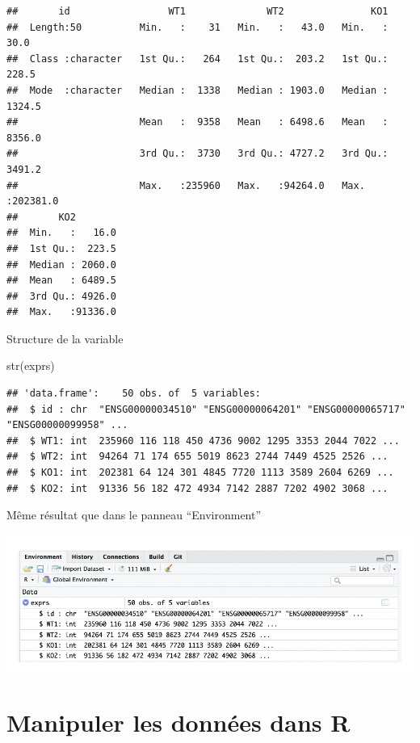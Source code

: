 \documentclass[
]{book}
\newenvironment{Shaded}{\begin{snugshade}}{\end{snugshade}}
\newcommand{\FunctionTok}[1]{\textcolor[rgb]{0.00,0.00,0.00}{#1}}
\newcommand{\NormalTok}[1]{#1}
\begin{document}
\begin{verbatim}
##       id                 WT1              WT2               KO1          
##  Length:50          Min.   :    31   Min.   :   43.0   Min.   :    30.0  
##  Class :character   1st Qu.:   264   1st Qu.:  203.2   1st Qu.:   228.5  
##  Mode  :character   Median :  1338   Median : 1903.0   Median :  1324.5  
##                     Mean   :  9358   Mean   : 6498.6   Mean   :  8356.0  
##                     3rd Qu.:  3730   3rd Qu.: 4727.2   3rd Qu.:  3491.2  
##                     Max.   :235960   Max.   :94264.0   Max.   :202381.0  
##       KO2         
##  Min.   :   16.0  
##  1st Qu.:  223.5  
##  Median : 2060.0  
##  Mean   : 6489.5  
##  3rd Qu.: 4926.0  
##  Max.   :91336.0
\end{verbatim}

Structure de la variable

\begin{Shaded}
\begin{Highlighting}[]
\FunctionTok{str}\NormalTok{(exprs)}
\end{Highlighting}
\end{Shaded}

\begin{verbatim}
## 'data.frame':    50 obs. of  5 variables:
##  $ id : chr  "ENSG00000034510" "ENSG00000064201" "ENSG00000065717" "ENSG00000099958" ...
##  $ WT1: int  235960 116 118 450 4736 9002 1295 3353 2044 7022 ...
##  $ WT2: int  94264 71 174 655 5019 8623 2744 7449 4525 2526 ...
##  $ KO1: int  202381 64 124 301 4845 7720 1113 3589 2604 6269 ...
##  $ KO2: int  91336 56 182 472 4934 7142 2887 7202 4902 3068 ...
\end{verbatim}

Même résultat que dans le panneau ``Environment''

\includegraphics{images/envExpr.png}

\hypertarget{manipuler-les-donnuxe9es-dans-r}{%
\chapter{Manipuler les données dans R}\label{manipuler-les-donnuxe9es-dans-r}}
\end{document}
